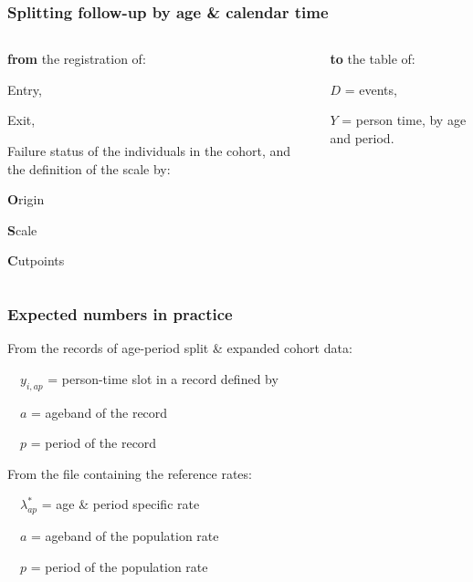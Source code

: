 \documentclass[handout,12pt]{beamer}
\begin{document}
\begin{frame} \frametitle{Splitting follow-up by age \& calendar time}

\begin{columns}[t]
\begin{column}{0.6\textwidth}
{\bf from} the registration of:
\bi
\item   Entry,
\item  Exit,
\item Failure status
\ei
 of the individuals in the cohort,
 and the definition of the scale by:
 \bi
 \item
 \textbf{O}rigin
 \item
 \textbf{S}cale
 \item
 \textbf{C}utpoints\\
\ei
\end{column}
%
\begin{column}{0.4\textwidth}
\bigskip
{\bf to} the table of:
\bi
\item
  $D$ = events,
  \medskip
  \item
  $Y$ = person time,
  \ei
 by age and period.
\end{column}
\end{columns}

\end{frame} 

\begin{frame} \frametitle{Expected numbers in practice}
\bi
\item From the records of age-period split \& expanded 
  cohort data:
\item[ ] $\quad y_{i,ap}$ = person-time slot in a record defined by
\item[ ] $\quad a$ = ageband of the record
\item[ ] $\quad p$ = period of the record

\bigskip

\item From the file containing the reference rates:
\item[ ] $\quad \lambda_{ap}^*$ = age \& period specific rate
\item[ ] $\quad a$ = ageband of the population rate
\item[ ] $\quad p$ = period of the population rate
\ei
\end{frame}
\end{document}
